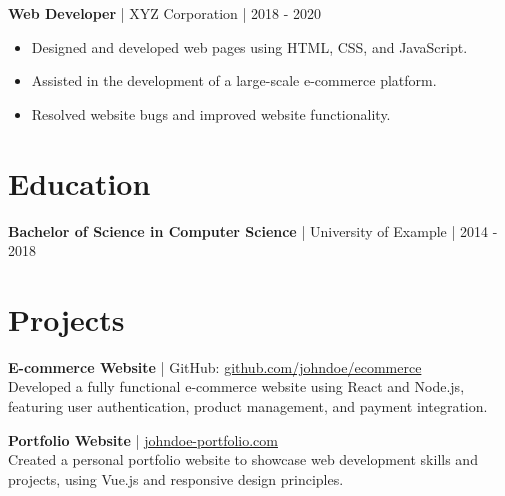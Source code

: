 \documentclass[letterpaper,11pt]{article}
\begin{document}
\noindent
\textbf{Web Developer} | XYZ Corporation | 2018 - 2020 \\
\begin{itemize}[leftmargin=0.2in, itemsep=0pt]
    \item Designed and developed web pages using HTML, CSS, and JavaScript.
    \item Assisted in the development of a large-scale e-commerce platform.
    \item Resolved website bugs and improved website functionality.
\end{itemize}

\section*{\textcolor{heading}{Education}}
\noindent
\textbf{Bachelor of Science in Computer Science} | University of Example | 2014 - 2018

\section*{\textcolor{heading}{Projects}}
\noindent
\textbf{E-commerce Website} | GitHub: \href{https://github.com/johndoe/ecommerce}{github.com/johndoe/ecommerce} \\
Developed a fully functional e-commerce website using React and Node.js, featuring user authentication, product management, and payment integration.

\noindent
\textbf{Portfolio Website} | \href{https://johndoe-portfolio.com}{johndoe-portfolio.com} \\
Created a personal portfolio website to showcase web development skills and projects, using Vue.js and responsive design principles.
\end{document}
